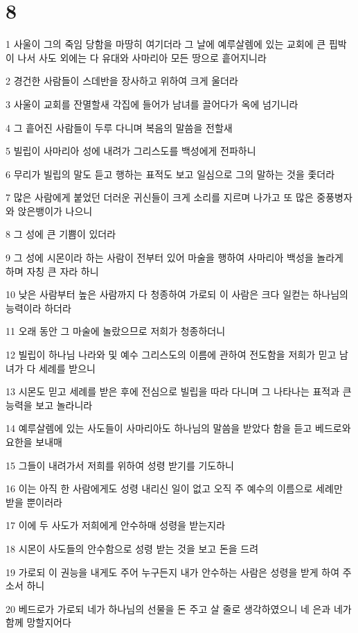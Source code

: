 \chapter{8}

\par 1 사울이 그의 죽임 당함을 마땅히 여기더라 그 날에 예루살렘에 있는 교회에 큰 핍박이 나서 사도 외에는 다 유대와 사마리아 모든 땅으로 흩어지니라
\par 2 경건한 사람들이 스데반을 장사하고 위하여 크게 울더라
\par 3 사울이 교회를 잔멸할새 각집에 들어가 남녀를 끌어다가 옥에 넘기니라
\par 4 그 흩어진 사람들이 두루 다니며 복음의 말씀을 전할새
\par 5 빌립이 사마리아 성에 내려가 그리스도를 백성에게 전파하니
\par 6 무리가 빌립의 말도 듣고 행하는 표적도 보고 일심으로 그의 말하는 것을 좇더라
\par 7 많은 사람에게 붙었던 더러운 귀신들이 크게 소리를 지르며 나가고 또 많은 중풍병자와 앉은뱅이가 나으니
\par 8 그 성에 큰 기쁨이 있더라
\par 9 그 성에 시몬이라 하는 사람이 전부터 있어 마술을 행하여 사마리아 백성을 놀라게 하며 자칭 큰 자라 하니
\par 10 낮은 사람부터 높은 사람까지 다 청종하여 가로되 이 사람은 크다 일컫는 하나님의 능력이라 하더라
\par 11 오래 동안 그 마술에 놀랐으므로 저희가 청종하더니
\par 12 빌립이 하나님 나라와 및 예수 그리스도의 이름에 관하여 전도함을 저희가 믿고 남녀가 다 세례를 받으니
\par 13 시몬도 믿고 세례를 받은 후에 전심으로 빌립을 따라 다니며 그 나타나는 표적과 큰 능력을 보고 놀라니라
\par 14 예루살렘에 있는 사도들이 사마리아도 하나님의 말씀을 받았다 함을 듣고 베드로와 요한을 보내매
\par 15 그들이 내려가서 저희를 위하여 성령 받기를 기도하니
\par 16 이는 아직 한 사람에게도 성령 내리신 일이 없고 오직 주 예수의 이름으로 세례만 받을 뿐이러라
\par 17 이에 두 사도가 저희에게 안수하매 성령을 받는지라
\par 18 시몬이 사도들의 안수함으로 성령 받는 것을 보고 돈을 드려
\par 19 가로되 이 권능을 내게도 주어 누구든지 내가 안수하는 사람은 성령을 받게 하여 주소서 하니
\par 20 베드로가 가로되 네가 하나님의 선물을 돈 주고 살 줄로 생각하였으니 네 은과 네가 함께 망할지어다
